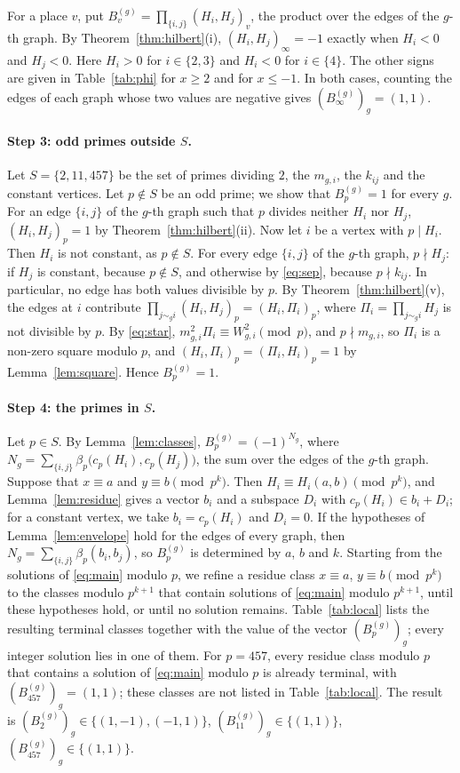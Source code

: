 \documentclass[11pt]{article}
\begin{document}
For a place $v$, put $B^{(g)}_v=\prod_{\{i,j\}}(H_i,H_j)_v$, the product over the edges of the $g$-th graph. By Theorem~\ref{thm:hilbert}(i), $(H_i,H_j)_\infty=-1$ exactly when $H_i<0$ and $H_j<0$. Here $H_i>0$ for $i\in\{2,\allowbreak 3\}$ and $H_i<0$ for $i\in\{4\}$. The other signs are given in Table~\ref{tab:phi} for $x\geq2$ and for $x\leq-1$. In both cases, counting the edges of each graph whose two values are negative gives $(B^{(g)}_\infty)_g=(1,1)$.

\paragraph{Step 3: odd primes outside $S$.} Let $S=\{2,11,457\}$ be the set of primes dividing $2$, the $m_{g,i}$, the $k_{ij}$ and the constant vertices. Let $p\notin S$ be an odd prime; we show that $B^{(g)}_p=1$ for every $g$. For an edge $\{i,j\}$ of the $g$-th graph such that $p$ divides neither $H_i$ nor $H_j$, $(H_i,H_j)_p=1$ by Theorem~\ref{thm:hilbert}(ii). Now let $i$ be a vertex with $p\mid H_i$. Then $H_i$ is not constant, as $p\notin S$. For every edge $\{i,j\}$ of the $g$-th graph, $p\nmid H_j$: if $H_j$ is constant, because $p\notin S$, and otherwise by \eqref{eq:sep}, because $p\nmid k_{ij}$. In particular, no edge has both values divisible by $p$. By Theorem~\ref{thm:hilbert}(v), the edges at $i$ contribute $\prod_{j\sim_g i}(H_i,H_j)_p=(H_i,\Pi_i)_p$, where $\Pi_i=\prod_{j\sim_g i}H_j$ is not divisible by $p$. By \eqref{eq:star}, $m_{g,i}^2\Pi_i\equiv W_{g,i}^2\pmod p$, and $p\nmid m_{g,i}$, so $\Pi_i$ is a non-zero square modulo $p$, and $(H_i,\Pi_i)_p=(\Pi_i,H_i)_p=1$ by Lemma~\ref{lem:square}. Hence $B^{(g)}_p=1$.

\paragraph{Step 4: the primes in $S$.} Let $p\in S$. By Lemma~\ref{lem:classes}, $B^{(g)}_p=(-1)^{N_g}$, where $N_g=\sum_{\{i,j\}}\beta_p\bigl(c_p(H_i),c_p(H_j)\bigr)$, the sum over the edges of the $g$-th graph. Suppose that $x\equiv a$ and $y\equiv b\pmod{p^k}$. Then $H_i\equiv H_i(a,b)\pmod{p^k}$, and Lemma~\ref{lem:residue} gives a vector $b_i$ and a subspace $D_i$ with $c_p(H_i)\in b_i+D_i$; for a constant vertex, we take $b_i=c_p(H_i)$ and $D_i=0$. If the hypotheses of Lemma~\ref{lem:envelope} hold for the edges of every graph, then $N_g=\sum_{\{i,j\}}\beta_p(b_i,b_j)$, so $B^{(g)}_p$ is determined by $a$, $b$ and $k$. Starting from the solutions of \eqref{eq:main} modulo $p$, we refine a residue class $x\equiv a$, $y\equiv b\pmod{p^k}$ to the classes modulo $p^{k+1}$ that contain solutions of \eqref{eq:main} modulo $p^{k+1}$, until these hypotheses hold, or until no solution remains. Table~\ref{tab:local} lists the resulting terminal classes together with the value of the vector $(B^{(g)}_p)_g$; every integer solution lies in one of them. For $p=457$, every residue class modulo $p$ that contains a solution of \eqref{eq:main} modulo $p$ is already terminal, with $(B^{(g)}_{457})_g=(1,1)$; these classes are not listed in Table~\ref{tab:local}. The result is $(B^{(g)}_{2})_g\in\{(1,-1),\allowbreak (-1,1)\}$, $(B^{(g)}_{11})_g\in\{(1,1)\}$, $(B^{(g)}_{457})_g\in\{(1,1)\}$.
\end{document}
